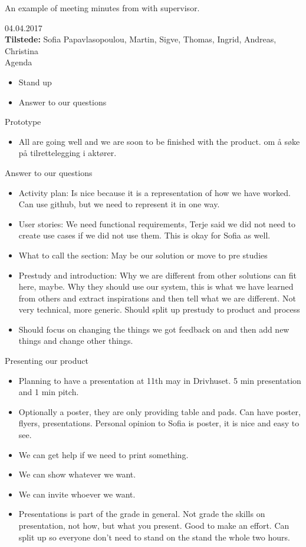 An example of meeting minutes from with supervisor.

{\huge{04.04.2017}}\\
\textbf{Tilstede:} Sofia Papavlasopoulou, Martin, Sigve, Thomas, Ingrid, Andreas, Christina\\


{\Large{Agenda}}
\begin{itemize} 
    \item Stand up
    \item Answer to our questions
\end{itemize} 

{\large{Prototype}}
\begin{itemize}  
    \item All are going well and we are soon to be finished with the product. om å søke på tilrettelegging i aktører.
\end{itemize}

{\large{Answer to our questions}}
\begin{itemize}  
    \item Activity plan: Is nice because it is a representation of how we have worked. Can use github, but we need to represent it in one way.
    \item User stories: We need functional requirements, Terje said we did not need to create use cases if we did not use them. This is okay for Sofia as well.
    \item What to call the section: May be our solution or move to pre studies
    \item Prestudy and introduction: Why we are different from other solutions can fit here, maybe. Why they should use our system, this is what we have learned from others and extract inspirations and then tell what we are different. Not very technical, more generic. Should split up prestudy to product and process
    \item Should focus on changing the things we got feedback on and then add new things and change other things.
\end{itemize}

{\large{Presenting our product}}
\begin{itemize}  
    \item Planning to have a presentation at 11th may in Drivhuset. 5 min presentation and 1 min pitch.
    \item Optionally a poster, they are only providing table and pads. Can have poster, flyers, presentations. Personal opinion to Sofia is poster, it is nice and easy to see. 
    \item We can get help if we need to print something.
    \item We can show whatever we want. 
    \item We can invite whoever we want.
    \item Presentations is part of the grade in general. Not grade the skills on presentation, not how, but what you present. Good to make an effort.
Can split up so everyone don’t need to stand on the stand the whole two hours.
\end{itemize}

